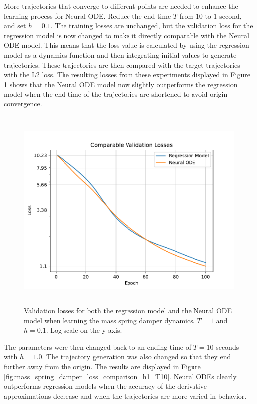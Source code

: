 \documentclass[12pt,a4paper]{book}
\begin{document}
More trajectories that converge to different points are needed to enhance the learning process for Neural ODE. Reduce the end time $T$ from $10$ to $1$ second, and set $h = 0.1$. The training losses are unchanged, but the validation loss for the regression model is now changed to make it directly comparable with the Neural ODE model. This means that the loss value is calculated by using the regression model as a dynamics function and then integrating initial values to generate trajectories. These trajectories are then compared with the target trajectories with the L2 loss. The resulting losses from these experiments displayed in Figure \ref{fig:mass_spring_damper_loss_comparison_h01_T1} shows that the Neural ODE model now slightly outperforms the regression model when the end time of the trajectories are shortened to avoid origin convergence.

\begin{figure}[H]
    \centering
    \includegraphics[height=10cm]{figs/plots/basic_experiments/mass_spring_damper_loss_comparison_h01_T1.pdf}
    \caption{Validation losses for both the regression model and the Neural ODE model when learning the mass spring damper dynamics. $T = 1$ and $h = 0.1$. Log scale on the y-axis.}
    \label{fig:mass_spring_damper_loss_comparison_h01_T1}
\end{figure}

The parameters were then changed back to an ending time of $T = 10$ seconds with $h = 1.0$. The trajectory generation was also changed so that they end further away from the origin. The results are displayed in Figure \ref{fig:mass_spring_damper_loss_comparison_h1_T10}. Neural ODEs clearly outperforms regression models when the accuracy of the derivative approximations decrease and when the trajectories are more varied in behavior.
\end{document}
